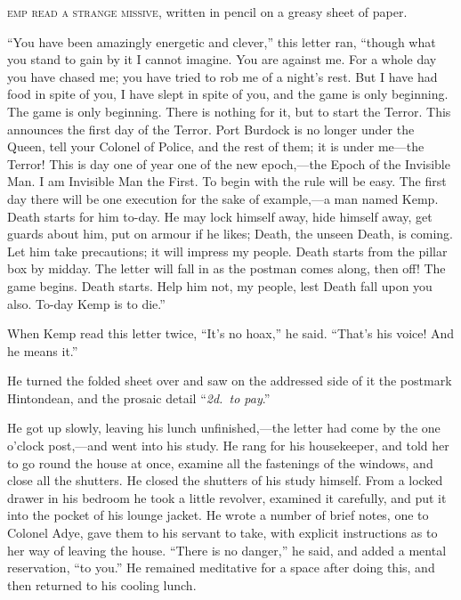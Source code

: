 \label{ch:27}
\begin{ChapterStart}
\vspace*{2\nbs}

\vspace{1.5\nbs}
\vspace{0.75\nbs}
\end{ChapterStart}

\kern-8pt\textsc{emp read a strange missive}, written in pencil on a greasy sheet of paper.

“You have been amazingly energetic and clever,” this letter ran, “though what you stand to gain by it I cannot imagine. You are against me. For a whole day you have chased me; you have tried to rob me of a night’s rest. But I have had food in spite of you, I have slept in spite of you, and the game is only beginning. The game is only beginning. There is nothing for it, but to start the Terror. This announces the first day of the Terror. Port Burdock is no longer under the Queen, tell your Colonel of Police, and the rest of them; it is under me—the Terror! This is day one of year one of the new epoch,—the Epoch of the Invisible Man. I am Invisible Man the First. To begin with the rule will be easy. The first day there will be one execution for the sake of example,—a man named Kemp. Death starts for him to-day. He may lock himself away, hide himself away, get guards about him, put on armour if he likes; Death, the unseen Death, is coming. Let him take precautions; it will impress my people. Death starts from the pillar box by midday. The letter will fall in as the postman comes along, then off! The game begins. Death starts. Help him not, my people, lest Death fall upon you also. To-day Kemp is to die.”

When Kemp read this letter twice, “It’s no hoax,” he said. “That’s his voice! And he means it.”

He turned the folded sheet over and saw on the addressed side of it the postmark Hintondean, and the prosaic detail “\emph{2d.\ to pay}.”

He got up slowly, leaving his lunch unfinished,—the letter had come by the one o’clock post,—and went into his study. He rang for his housekeeper, and told her to go round the house at once, examine all the fastenings of the windows, and close all the shutters. He closed the shutters of his study himself. From a locked drawer in his bedroom he took a little revolver, examined it carefully, and put it into the pocket of his lounge jacket. He wrote a number of brief notes, one to Colonel Adye, gave them to his servant to take, with explicit instructions as to her way of leaving the house. “There is no danger,” he said, and added a mental reservation, “to you.” He remained meditative for a space after doing this, and then returned to his cooling lunch.


